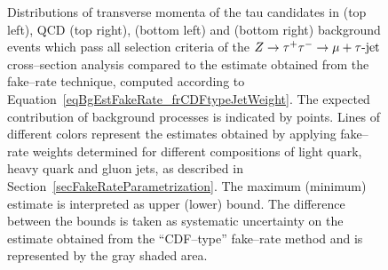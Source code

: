 \begin{figure}[t]
\begin{center}
\begin{picture}
\end{picture}
\caption[Tau transverse momentum in the fake--rate method]{\captiontext
Distributions of transverse momenta of the tau candidates in \WpJets (top
left), QCD (top right), \ttbarpJets (bottom left) and \ZMM (bottom right)
background events which pass all selection criteria of the $\ZTT \to \mu +
\tau\mbox{-jet}$ cross--section analysis compared to the estimate obtained from
the fake--rate technique, computed according to
Equation~\ref{eqBgEstFakeRate_frCDFtypeJetWeight}.  The expected contribution of
background processes is indicated by points.  Lines of different colors
represent the estimates obtained by applying fake--rate weights determined for
different compositions of light quark, heavy quark and gluon jets, as described
in Section~\ref{secFakeRateParametrization}.  The maximum (minimum) estimate is
interpreted as upper (lower) bound.  The difference between the bounds is taken
as systematic uncertainty on the estimate obtained from the ``CDF--type''
fake--rate method and is represented by the gray shaded area.}
\label{figBgEstFakeRate_frCDFtypeResults_tauJetPt}
\end{center}
\end{figure} 

